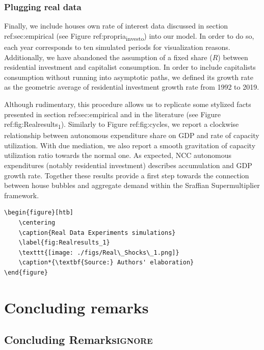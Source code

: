 \documentclass[12pt]{article}
\begin{document}
\subsubsection{Plugging real data}
\label{sec:orga515f5d}
\label{real_sim}

Finally, we include houses own rate of interest data  discussed in section ref:sec:empirical (see Figure ref:propria\textsubscript{investo}) into our model.
In order to do so, each year corresponds to ten simulated periods for visualization reasons.
Additionally, we have abandoned the assumption of a fixed share (\(R\)) between residential investment and capitalist consumption.
In order to include capitalists consumption without running into asymptotic paths, we defined its growth rate as the geometric average of residential investment growth rate from 1992 to 2019.

Although rudimentary, this procedure allows us to replicate some stylized facts presented in section ref:sec:empirical and in the literature (see Figure ref:fig:Realresults\textsubscript{1}).
Similarly to Figure ref:fig:cycles, we report a clockwise relationship between autonomous expenditure share on GDP and rate of capacity utilization.
With due mediation, we also report a smooth gravitation of capacity utilization ratio towards the normal one.
As expected, NCC autonomous expenditures (notably residential investment) describes accumulation and GDP growth rate. 
Together these results provide a first step towards the connection between house bubbles and aggregate demand within the Sraffian Supermultiplier framework.






\begin{verbatim}
\begin{figure}[htb]
	\centering
	\caption{Real Data Experiments simulations}
	\label{fig:Realresults_1}
	\texttt{[image: ./figs/Real\_Shocks\_1.png]}
	\caption*{\textbf{Source:} Authors' elaboration}
\end{figure}
\end{verbatim}



\section{Concluding remarks}
\label{sec:orgcac3e1a}
\label{sec:Conclusion}
\subsection{Concluding Remarks\hfill{}\textsc{ignore}}
\label{sec:org7ff81c5}
\end{document}
